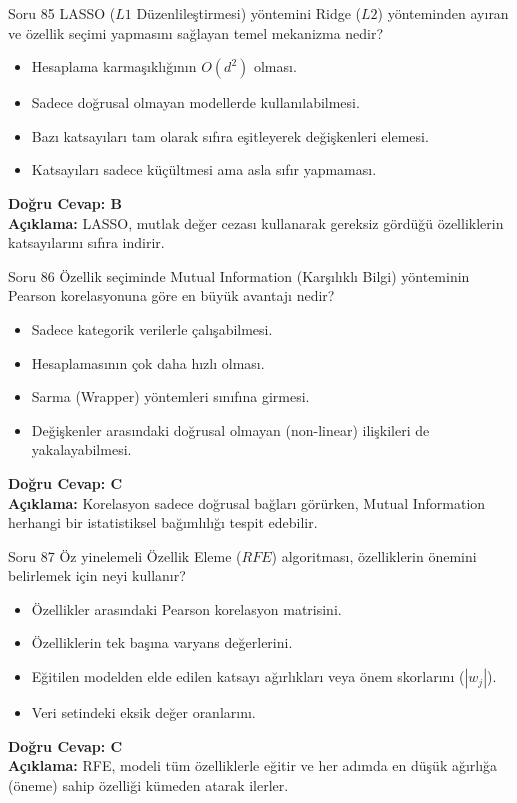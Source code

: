 \documentclass[12pt,a4paper]{article}
\begin{document}
\begin{testcard}{Soru 85}
    LASSO ($L1$ Düzenlileştirmesi) yöntemini Ridge ($L2$) yönteminden ayıran ve özellik seçimi yapmasını sağlayan temel mekanizma nedir?
    \begin{itemize}
        \item[A)] Hesaplama karmaşıklığının $O(d^2)$ olması.
        \item[B)] Sadece doğrusal olmayan modellerde kullanılabilmesi.
        \item[C)] Bazı katsayıları tam olarak sıfıra eşitleyerek değişkenleri elemesi.
        \item[D)] Katsayıları sadece küçültmesi ama asla sıfır yapmaması.
    \end{itemize}
    \tcblower
    \textbf{Doğru Cevap: B} \\
    \textbf{Açıklama:} LASSO, mutlak değer cezası kullanarak gereksiz gördüğü özelliklerin katsayılarını sıfıra indirir.
\end{testcard}

\begin{testcard}{Soru 86}
    Özellik seçiminde Mutual Information (Karşılıklı Bilgi) yönteminin Pearson korelasyonuna göre en büyük avantajı nedir?
    \begin{itemize}
        \item[A)] Sadece kategorik verilerle çalışabilmesi.
        \item[B)] Hesaplamasının çok daha hızlı olması.
        \item[C)] Sarma (Wrapper) yöntemleri sınıfına girmesi.
        \item[D)] Değişkenler arasındaki doğrusal olmayan (non-linear) ilişkileri de yakalayabilmesi.
    \end{itemize}
    \tcblower
    \textbf{Doğru Cevap: C} \\
    \textbf{Açıklama:} Korelasyon sadece doğrusal bağları görürken, Mutual Information herhangi bir istatistiksel bağımlılığı tespit edebilir.
\end{testcard}

\begin{testcard}{Soru 87}
    Öz yinelemeli Özellik Eleme ($RFE$) algoritması, özelliklerin önemini belirlemek için neyi kullanır?
    \begin{itemize}
        \item[A)] Özellikler arasındaki Pearson korelasyon matrisini.
        \item[B)] Özelliklerin tek başına varyans değerlerini.
        \item[C)] Eğitilen modelden elde edilen katsayı ağırlıkları veya önem skorlarını ($|w_j|$).
        \item[D)] Veri setindeki eksik değer oranlarını.
    \end{itemize}
    \tcblower
    \textbf{Doğru Cevap: C} \\
    \textbf{Açıklama:} RFE, modeli tüm özelliklerle eğitir ve her adımda en düşük ağırlığa (öneme) sahip özelliği kümeden atarak ilerler.
\end{testcard}
\end{document}

